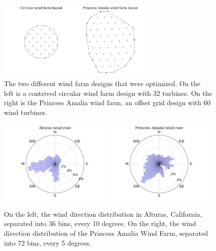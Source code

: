 \begin{figure}[htbp]
  \centering
   \includegraphics[trim={0 0.5cm 0 0.5cm},clip,width=0.7\textwidth]{Figures/baseline_layouts.pdf}
  \caption{\label{layouts} The two different wind farm designs that were optimized. On the left is a contrived circular wind farm design with 32 turbines. On the right is the Princess Amalia wind farm, an offset grid design with 60 wind turbines. }
\end{figure}
%
\begin{figure}[htbp]
  \centering
  \includegraphics[width=0.49\textwidth]{Figures/alturas_rose.pdf}
  \includegraphics[width=0.49\textwidth]{Figures/amalia_rose.pdf}
  \caption{\label{wind_roses} On the left, the wind direction distribution in Alturas, California, separated into 36 bins, every 10 degrees. On the right, the wind direction distribution of the Princess Amalia Wind Farm, separated into 72 bins, every 5 degrees.}
\end{figure}
%
